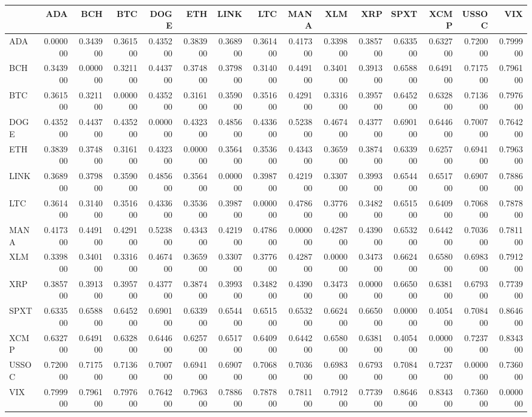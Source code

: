 \begin{tabular}{lrrrrrrrrrrrrrr}
\toprule
 & ADA & BCH & BTC & DOGE & ETH & LINK & LTC & MANA & XLM & XRP & SPXT & XCMP & USSOC & VIX \\
\midrule
ADA & 0.000000 & 0.343900 & 0.361500 & 0.435200 & 0.383900 & 0.368900 & 0.361400 & 0.417300 & 0.339800 & 0.385700 & 0.633500 & 0.632700 & 0.720000 & 0.799900 \\
BCH & 0.343900 & 0.000000 & 0.321100 & 0.443700 & 0.374800 & 0.379800 & 0.314000 & 0.449100 & 0.340100 & 0.391300 & 0.658800 & 0.649100 & 0.717500 & 0.796100 \\
BTC & 0.361500 & 0.321100 & 0.000000 & 0.435200 & 0.316100 & 0.359000 & 0.351600 & 0.429100 & 0.331600 & 0.395700 & 0.645200 & 0.632800 & 0.713600 & 0.797600 \\
DOGE & 0.435200 & 0.443700 & 0.435200 & 0.000000 & 0.432300 & 0.485600 & 0.433600 & 0.523800 & 0.467400 & 0.437700 & 0.690100 & 0.644600 & 0.700700 & 0.764200 \\
ETH & 0.383900 & 0.374800 & 0.316100 & 0.432300 & 0.000000 & 0.356400 & 0.353600 & 0.434300 & 0.365900 & 0.387400 & 0.633900 & 0.625700 & 0.694100 & 0.796300 \\
LINK & 0.368900 & 0.379800 & 0.359000 & 0.485600 & 0.356400 & 0.000000 & 0.398700 & 0.421900 & 0.330700 & 0.399300 & 0.654400 & 0.651700 & 0.690700 & 0.788600 \\
LTC & 0.361400 & 0.314000 & 0.351600 & 0.433600 & 0.353600 & 0.398700 & 0.000000 & 0.478600 & 0.377600 & 0.348200 & 0.651500 & 0.640900 & 0.706800 & 0.787800 \\
MANA & 0.417300 & 0.449100 & 0.429100 & 0.523800 & 0.434300 & 0.421900 & 0.478600 & 0.000000 & 0.428700 & 0.439000 & 0.653200 & 0.644200 & 0.703600 & 0.781100 \\
XLM & 0.339800 & 0.340100 & 0.331600 & 0.467400 & 0.365900 & 0.330700 & 0.377600 & 0.428700 & 0.000000 & 0.347300 & 0.662400 & 0.658000 & 0.698300 & 0.791200 \\
XRP & 0.385700 & 0.391300 & 0.395700 & 0.437700 & 0.387400 & 0.399300 & 0.348200 & 0.439000 & 0.347300 & 0.000000 & 0.665000 & 0.638100 & 0.679300 & 0.773900 \\
SPXT & 0.633500 & 0.658800 & 0.645200 & 0.690100 & 0.633900 & 0.654400 & 0.651500 & 0.653200 & 0.662400 & 0.665000 & 0.000000 & 0.405400 & 0.708400 & 0.864600 \\
XCMP & 0.632700 & 0.649100 & 0.632800 & 0.644600 & 0.625700 & 0.651700 & 0.640900 & 0.644200 & 0.658000 & 0.638100 & 0.405400 & 0.000000 & 0.723700 & 0.834300 \\
USSOC & 0.720000 & 0.717500 & 0.713600 & 0.700700 & 0.694100 & 0.690700 & 0.706800 & 0.703600 & 0.698300 & 0.679300 & 0.708400 & 0.723700 & 0.000000 & 0.736000 \\
VIX & 0.799900 & 0.796100 & 0.797600 & 0.764200 & 0.796300 & 0.788600 & 0.787800 & 0.781100 & 0.791200 & 0.773900 & 0.864600 & 0.834300 & 0.736000 & 0.000000 \\
\bottomrule
\end{tabular}
